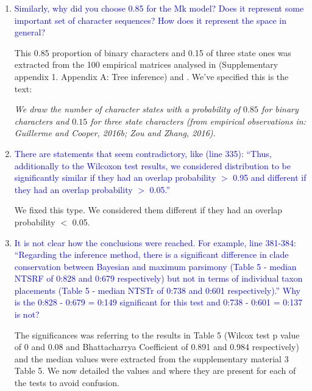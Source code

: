 \documentclass[12pt,letterpaper]{article}
\begin{document}
\begin{enumerate}

\item{\textcolor{blue}{Similarly, why did you choose 0.85 for the Mk model? Does it represent some important set of character sequences? How does it represent the space in general?}}

This 0.85 proportion of binary characters and 0.15 of three state ones was extracted from the 100 empirical matrices analysed in \cite{Guillerme2016146} (Supplementary appendix 1. Appendix A: Tree inference) and \cite{ZouConvergence}.
We've specified this is the text:

\textit{We draw the number of character states with a probability of $0.85$ for binary characters and $0.15$ for three state characters (from empirical observations in: Guillerme and Cooper, 2016b; Zou and Zhang, 2016).}

\item{\textcolor{blue}{There are statements that seem contradictory, like (line 335): ``Thus, additionally to the Wilcoxon test results, we considered distribution to be significantly similar if they had an overlap probability $>$ 0.95 and different if they had an overlap probability $>$ 0.05.''}}

We fixed this type. We considered them different if they had an overlap probability $<$ 0.05.

\item{\textcolor{blue}{It is not clear how the conclusions were reached. For example, line 381-384: ``Regarding the inference method, there is a significant difference in clade conservation between Bayesian and maximum parsimony (Table 5 - median NTSRF of 0:828 and 0:679 respectively) but not in terms of individual taxon placements (Table 5 - median NTSTr of 0:738 and 0:601 respectively).'' Why is the 0:828 - 0:679 = 0:149 significant for this test and 0:738 - 0:601 = 0:137 is not?}}

The significances was referring to the results in Table 5 (Wilcox test p value of 0 and 0.08 and Bhattacharrya Coefficient of 0.891 and 0.984 respectively) and the median values were extracted from the supplementary material 3 Table 5.
We now detailed the values and where they are present for each of the tests to avoid confusion.

\end{enumerate}
\end{document}
